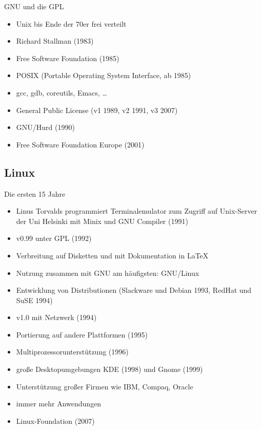 \documentclass{beamer}
\begin{document}
\begin{frame}{GNU und die GPL}
    \begin{itemize}
        \item Unix bis Ende der 70er frei verteilt
        \item Richard Stallman (1983)
        \item Free Software Foundation (1985)
        \item POSIX (Portable Operating System Interface, ab 1985)
        \item gcc, gdb, coreutils, Emacs, …
        \item General Public License (v1 1989, v2 1991, v3 2007)
        \item GNU/Hurd (1990)
        \item Free Software Foundation Europe (2001)
    \end{itemize}
\end{frame}

\subsection{Linux}

\begin{frame}{Die ersten 15 Jahre}
    \begin{itemize}
        \item Linus Torvalds programmiert Terminalemulator zum Zugriff
            auf Unix-Server der Uni Helsinki mit Minix und GNU Compiler
            (1991)
        \item v0.99 unter GPL (1992)
        \item Verbreitung auf Disketten und mit Dokumentation in \LaTeX
        \item Nutzung zusammen mit GNU am häufigsten: GNU/Linux
        \item Entwicklung von Distributionen (Slackware und Debian 1993,
            RedHat und SuSE 1994)
        \item v1.0 mit Netzwerk (1994)
        \item Portierung auf andere Plattformen (1995)
        \item Multiprozessorunterstützung (1996)
        \item große Desktopumgebungen KDE (1998) und Gnome (1999)
        \item Unterstützung großer Firmen wie IBM, Compaq, Oracle
        \item immer mehr Anwendungen
        \item Linux-Foundation (2007)
    \end{itemize}
\end{frame}
\end{document}
